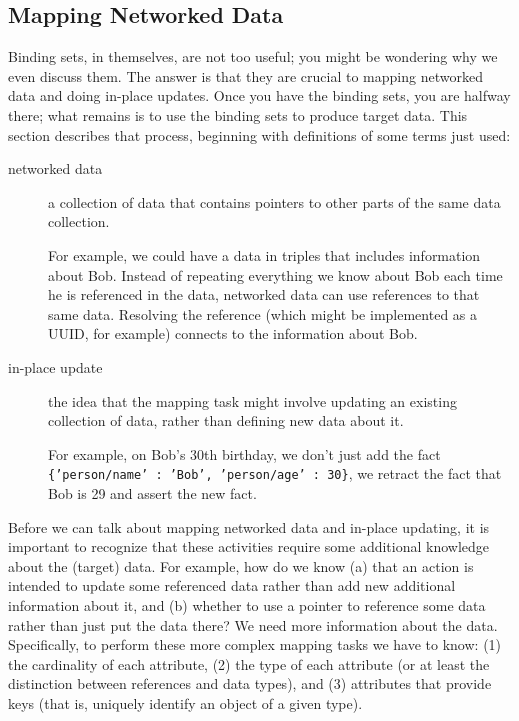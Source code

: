 \documentclass[9pt,letterpaper]{article}
\newcommand{\stt}[1]{\texttt{#1}} %
\begin{document}
\subsection{Mapping  Networked Data}

Binding sets, in themselves, are not too useful; you might be wondering why we even discuss them.
The answer is that they are crucial to mapping networked data and doing in-place updates.
Once you have the binding sets, you are halfway there; what remains is to use the binding sets to produce target data.
This section describes that process, beginning with definitions of some terms just used:

\begin{description}
\item[networked data] a collection of data that contains pointers to other parts of the same data collection.

  For example, we could have a data in triples that includes information about Bob.
  Instead of repeating everything we know about Bob each time he is referenced in the data,
  networked data can use references to that same data.
  Resolving the reference (which might be implemented as a UUID, for example) connects to the information about Bob.
\item[in-place update] the idea that the mapping task might involve updating an existing collection of data, rather than
  defining new data about it.

  For example, on Bob's 30th birthday, we don't just add the fact \stt{\{'person/name' : 'Bob', 'person/age' : 30\}}, we
  retract the fact that Bob is 29 and assert the new fact.
\end{description}

Before we can talk about mapping networked data and in-place updating, it is important to recognize that these activities require
some additional knowledge about the (target) data.
For example, how do we know
(a) that an action is intended to update some referenced data rather than add new additional information about it, and
(b) whether to use a pointer to reference some data rather than just put the data there?
We need more information about the data.
Specifically, to perform these more complex mapping tasks we have to know:
(1) the cardinality of each attribute,
(2) the type of each attribute (or at least the distinction between references and data types), and
(3) attributes that provide keys (that is, uniquely identify an object of a given type).
\end{document}

